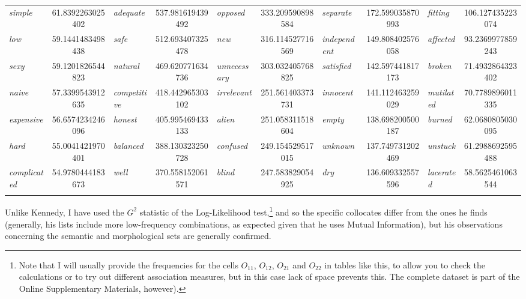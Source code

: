 \begin{sidewaystable}[!htbp]
\begin{tabular}[c]{lS|lS|lS|lS|lS}
\textit{simple} & \num{61.8392263025402} &  \textit{adequate} & \num{537.981619439492} &   \textit{opposed} & \num{333.209590898584} &  \textit{separate} & \num{172.599035870993} &    \textit{fitting} & \num{106.127435223074} \\
\textit{low} & \num{59.1441483498438} &  \textit{safe} & \num{512.693407325478} &   \textit{new} & \num{316.114527716569} &  \textit{independent} & \num{149.808402576058} &    \textit{affected} & \num{93.2369977859243} \\
\textit{sexy} & \num{59.1201826544823} &  \textit{natural} & \num{469.620771634736} &   \textit{unnecessary} & \num{303.032405768825} &  \textit{satisfied} & \num{142.597441817173} &    \textit{broken} & \num{71.4932864323402} \\
\textit{naive} & \num{57.3399543912635} &  \textit{competitive} & \num{418.442965303102} &   \textit{irrelevant} & \num{251.561403373731} &  \textit{innocent} & \num{141.112463259029} &  \textit{mutilated} & \num{70.7789896011335} \\
\textit{expensive} & \num{56.6574234246096} &  \textit{honest} & \num{405.995469433133} &   \textit{alien} & \num{251.058311518604} &  \textit{empty} & \num{138.698200500187} &    \textit{burned} & \num{62.0680805030095} \\
\textit{hard} & \num{55.0041421970401} &  \textit{balanced} & \num{388.130323250728} &   \textit{confused} & \num{249.154529517015} &  \textit{unknown} & \num{137.749731202469} &    \textit{unstuck} & \num{61.2988692595488} \\
\textit{complicated} & \num{54.9780444183673} &  \textit{well} & \num{370.558152061571} &   \textit{blind} & \num{247.583829054925} &  \textit{dry} & \num{136.609332557596} &    \textit{lacerated} & \num{58.5625461063544} \\
\lspbottomrule
\end{tabular}
\end{sidewaystable}

Unlike Kennedy, I have used the $G^2$ statistic of the Log-Likelihood test,\footnote{Note that I will usually provide the frequencies for the cells $O_{11}$, $O_{12}$, $O_{21}$ and $O_{22}$ in tables like this, to allow you to check the calculations or to try out different association measures, but in this case lack of space prevents this. The complete dataset is part of the Online Supplementary Materials, however).} and so the specific collocates differ from the ones he finds (generally, his lists include more low-frequency combinations, as expected given that he uses Mutual Information), but his observations concerning the semantic and morphological sets are generally confirmed.

